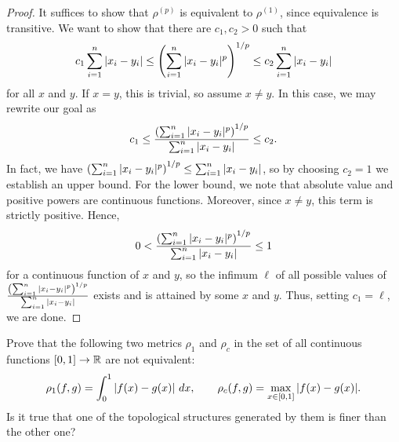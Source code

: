 \begin{proof}
    It suffices to show that $\rho^{(p)}$ is equivalent to $\rho^{(1)}$, since
    equivalence is transitive. We want to show that there are $c_1, c_2 > 0$
    such that
    \[
        c_1 \sum_{i=1}^{n}|x_i - y_i|\leq
        \left( \sum_{i=1}^{n}|x_i - y_i|^p \right)^{1/p} \leq
        c_2 \sum_{i=1}^{n}|x_i - y_i|
    \]
    for all $x$ and $y$. If $x = y$, this is trivial, so assume $x \ne y$. In
    this case, we may rewrite our goal as
    \[
        c_1 \leq 
        \frac{\left( \sum_{i=1}^{n}|x_i - y_i|^p \right)^{1/p}}
        {\sum_{i=1}^{n}|x_i - y_i|}
        \leq c_2.
    \]
    In fact, we have $\left( \sum_{i=1}^{n}|x_i - y_i|^p \right)^{1/p}\leq
    \sum_{i=1}^{n}|x_i - y_i|$, so by choosing $c_2 = 1$ we establish an upper
    bound. For the lower bound, we note that absolute value and positive
    powers are continuous functions. Moreover, since $x \ne y$, this term is
    strictly positive. Hence, 
    \[
        0 < \frac{\left( \sum_{i=1}^{n}|x_i - y_i|^p \right)^{1/p}}
        {\sum_{i=1}^{n}|x_i - y_i|}
        \leq 1
    \]
    for a continuous function of $x$ and $y$, so the infimum $\ell$ of all possible
    values of $\frac{\left( \sum_{i=1}^{n}|x_i - y_i|^p \right)^{1/p}}
        {\sum_{i=1}^{n}|x_i - y_i|}$ exists and is attained by some $x$ and
        $y$. Thus, setting $c_1 = \ell$, we are done.
\end{proof}

\begin{minorEx}
    Prove that the following two metrics $\rho_1$ and $\rho_c$ in the set of all
    continuous functions $[0,1] \to \mathbb{R}$ are not equivalent:
    \[
        \rho_1(f,g) = \int_{0}^{1} \abs{f(x) - g(x)} \ dx, \qquad
        \rho_c(f,g) = \max_{x \in [0,1]} \abs{f(x) - g(x)}.
    \]
    Is it true that one of the topological structures generated by them is finer
    than the other one?
\end{minorEx}

